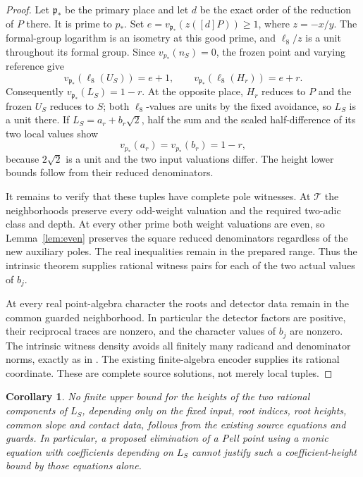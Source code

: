 \documentclass[11pt,a4paper]{article}
\newtheorem{corollary}[theorem]{Corollary}
\begin{document}
\begin{proof}
Let \(\mathfrak p_*\) be the primary place and let \(d\) be the
exact order of the reduction of \(P\) there. It is prime to \(p_*\).
Set \(e=v_{\mathfrak p_*}(z([d]P))\ge1\), where \(z=-x/y\).
The formal-group logarithm is an isometry at this good prime, and
\(\ell_8/z\) is a unit throughout its formal group. Since
\(v_{p_*}(n_S)=0\), the frozen point and varying reference give
\[
 v_{\mathfrak p_*}(\ell_8(U_S))=e+1,
 \qquad v_{\mathfrak p_*}(\ell_8(H_r))=e+r.
\]
Consequently \(v_{\mathfrak p_*}(L_S)=1-r\).
At the opposite place, \(H_r\) reduces to \(P\) and the frozen
\(U_S\) reduces to \(S\); both \(\ell_8\)-values are units by
the fixed avoidance, so \(L_S\) is a unit there.
If \(L_S=a_r+b_r\sqrt2\), half the sum and the scaled
half-difference of its two local values show
\[
                   v_{p_*}(a_r)=v_{p_*}(b_r)=1-r,
\]
because \(2\sqrt2\) is a unit and the two input valuations differ.
The height lower bounds follow from their reduced denominators.

It remains to verify that these tuples have complete pole witnesses.
At \(\mathcal T\) the neighborhoods preserve every odd-weight
valuation and the required two-adic class and depth. At every other
prime both weight valuations are even, so Lemma~\ref{lem:even}
preserves the square reduced denominators regardless of the new
auxiliary poles. The real inequalities remain in the prepared range.
Thus the intrinsic theorem supplies rational witness pairs for each
of the two actual values of \(b_j\).

At every real point-algebra character the roots and detector data
remain in the common guarded neighborhood. In particular the
detector factors are positive, their reciprocal traces are nonzero,
and the character values of \(b_j\) are nonzero. The intrinsic
witness density avoids all finitely many radicand and denominator
norms, exactly as in \cite{Scalar}. The existing finite-algebra
encoder supplies its rational coordinate. These are complete source
solutions, not merely local tuples.
\end{proof}

\begin{corollary}
No finite upper bound for the heights of the two rational components
of \(L_S\), depending only on the fixed input, root indices, root
heights, common slope and contact data, follows from the existing
source equations and guards. In particular, a proposed elimination
of a Pell point using a monic equation with coefficients depending on
\(L_S\) cannot justify such a coefficient-height bound by those
equations alone.
\end{corollary}
\end{document}
